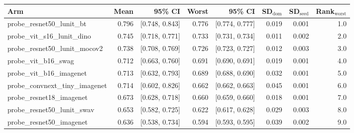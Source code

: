 \begin{tabular}{lrrrrrrr}
\toprule
Arm & Mean & 95\% CI & Worst & 95\% CI & SD$_\text{dom}$ & SD$_\text{seed}$ & Rank$_\text{worst}$ \\
\midrule
probe\_resnet50\_lunit\_bt & 0.796 & [0.748, 0.843] & 0.776 & [0.774, 0.777] & 0.019 & 0.001 & 1.0 \\
probe\_vit\_s16\_lunit\_dino & 0.745 & [0.718, 0.771] & 0.733 & [0.731, 0.734] & 0.011 & 0.002 & 2.0 \\
probe\_resnet50\_lunit\_mocov2 & 0.738 & [0.708, 0.769] & 0.726 & [0.723, 0.727] & 0.012 & 0.003 & 3.0 \\
probe\_vit\_b16\_swag & 0.712 & [0.663, 0.760] & 0.691 & [0.690, 0.691] & 0.019 & 0.001 & 4.0 \\
probe\_vit\_b16\_imagenet & 0.713 & [0.632, 0.793] & 0.689 & [0.688, 0.690] & 0.032 & 0.001 & 5.0 \\
probe\_convnext\_tiny\_imagenet & 0.714 & [0.602, 0.826] & 0.662 & [0.662, 0.663] & 0.045 & 0.001 & 6.0 \\
probe\_resnet18\_imagenet & 0.673 & [0.628, 0.718] & 0.660 & [0.659, 0.660] & 0.018 & 0.001 & 7.0 \\
probe\_resnet50\_lunit\_swav & 0.653 & [0.582, 0.725] & 0.622 & [0.617, 0.628] & 0.029 & 0.003 & 8.0 \\
probe\_resnet50\_imagenet & 0.636 & [0.538, 0.734] & 0.594 & [0.593, 0.595] & 0.039 & 0.002 & 9.0 \\
\bottomrule
\end{tabular}
